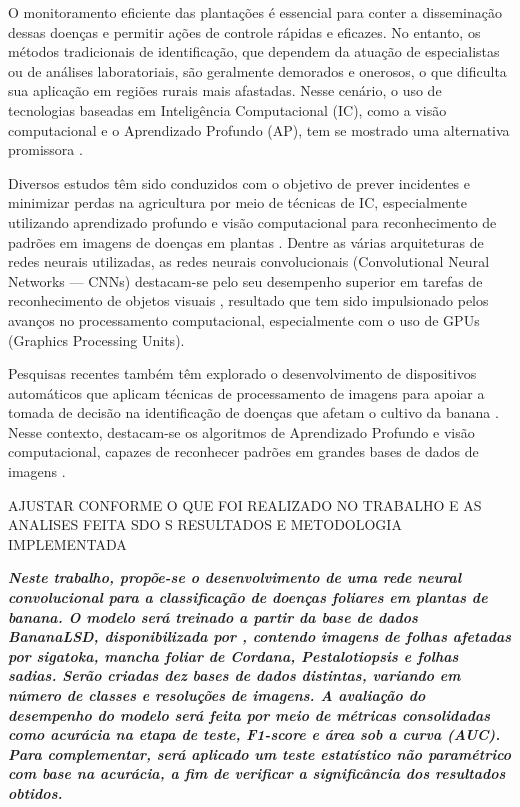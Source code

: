 O monitoramento eficiente das plantações é essencial para conter a disseminação dessas doenças e permitir ações de controle rápidas e eficazes. No entanto, os métodos tradicionais de identificação, que dependem da atuação de especialistas ou de análises laboratoriais, são geralmente demorados e onerosos, o que dificulta sua aplicação em regiões rurais mais afastadas. Nesse cenário, o uso de tecnologias baseadas em Inteligência Computacional (IC), como a visão computacional e o Aprendizado Profundo (AP), tem se mostrado uma alternativa promissora \cite{ZHANG2022, REZENDE2019}.

Diversos estudos têm sido conduzidos com o objetivo de prever incidentes e minimizar perdas na agricultura por meio de técnicas de IC, especialmente utilizando aprendizado profundo e visão computacional para reconhecimento de padrões em imagens de doenças em plantas \cite{GANDHI2018, LIU2017, MOHANTY2016}. Dentre as várias arquiteturas de redes neurais utilizadas, as redes neurais convolucionais (Convolutional Neural Networks — CNNs) destacam-se pelo seu desempenho superior em tarefas de reconhecimento de objetos visuais \cite{OLIVEIRA2018, PENHA2018, TODA2019}, resultado que tem sido impulsionado pelos avanços no processamento computacional, especialmente com o uso de GPUs (Graphics Processing Units).

Pesquisas recentes também têm explorado o desenvolvimento de dispositivos automáticos que aplicam técnicas de processamento de imagens para apoiar a tomada de decisão na identificação de doenças que afetam o cultivo da banana \cite{IBARRA2023}. Nesse contexto, destacam-se os algoritmos de Aprendizado Profundo e visão computacional, capazes de reconhecer padrões em grandes bases de dados de imagens \cite{REZENDE2019}.

AJUSTAR CONFORME O QUE FOI REALIZADO NO TRABALHO E AS ANALISES FEITA SDO S RESULTADOS E METODOLOGIA IMPLEMENTADA

\textbf{\textit{Neste trabalho, propõe-se o desenvolvimento de uma rede neural convolucional para a classificação de doenças foliares em plantas de banana. O modelo será treinado a partir da base de dados \textit{BananaLSD}, disponibilizada por \cite{ARMAN2023}, contendo imagens de folhas afetadas por sigatoka, mancha foliar de Cordana, Pestalotiopsis e folhas sadias. Serão criadas dez bases de dados distintas, variando em número de classes e resoluções de imagens. A avaliação do desempenho do modelo será feita por meio de métricas consolidadas como acurácia na etapa de teste, F1-score e área sob a curva (AUC). Para complementar, será aplicado um teste estatístico não paramétrico com base na acurácia, a fim de verificar a significância dos resultados obtidos.}}




